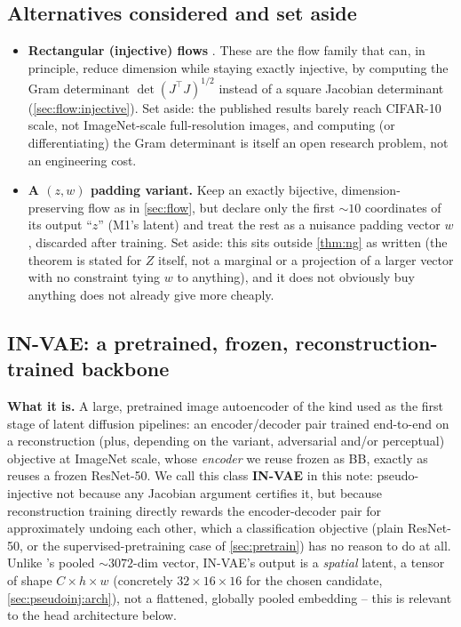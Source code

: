 \subsection{Alternatives considered and set aside}
\label{sec:pseudoinj:discarded}
\begin{itemize}[leftmargin=1.5em]
\item \textbf{Rectangular (injective) flows} \cite{caterini2021}. These are the flow family that can, in
      principle, reduce dimension while staying exactly injective, by computing the Gram determinant
      $\det(J^\top J)^{1/2}$ instead of a square Jacobian determinant (\cref{sec:flow:injective}). Set
      aside: the published results barely reach CIFAR-10 scale, not ImageNet-scale full-resolution 
      images, and computing (or differentiating) the Gram determinant is itself an open research 
      problem, not an engineering cost.
\item \textbf{A $(z,w)$ padding variant.} Keep an exactly bijective, dimension-preserving flow as in
      \cref{sec:flow}, but declare only the first $\sim\!10$ coordinates of its output ``$z$'' (M1's
      latent) and treat the rest as a nuisance padding vector $w$, discarded after training. Set aside:
      this sits outside \cref{thm:ng} as written (the theorem is stated for $Z$ itself, not a marginal or
      a projection of a larger vector with no constraint tying $w$ to anything), and it does not obviously
      buy anything  does not already give more cheaply.
\end{itemize}

\subsection{IN-VAE: a pretrained, frozen, reconstruction-trained backbone}
\label{sec:pseudoinj:invae}
\textbf{What it is.} A large, pretrained image autoencoder of the kind used as the first stage of latent
diffusion pipelines: an encoder/decoder pair trained end-to-end on a reconstruction (plus, depending on
the variant, adversarial and/or perceptual) objective at ImageNet scale, whose \emph{encoder} we reuse
frozen as BB, exactly as  reuses a frozen ResNet-50. We call this class \textbf{IN-VAE}
in this note: pseudo-injective not because any Jacobian argument certifies it, but because reconstruction
training directly rewards the encoder-decoder pair for approximately undoing each other, which a
classification objective (plain ResNet-50, or the supervised-pretraining case of \cref{sec:pretrain}) has
no reason to do at all. Unlike 's pooled $\sim\!3072$-dim vector, IN-VAE's output is a
\emph{spatial} latent, a tensor of shape $C\times h\times w$ (concretely $32\times16\times16$ for the
chosen candidate, \cref{sec:pseudoinj:arch}), not a flattened, globally pooled embedding -- this is
relevant to the head architecture below.

